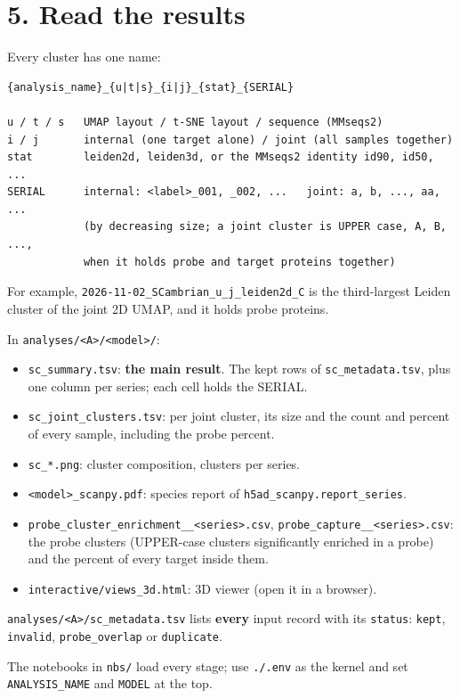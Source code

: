 \documentclass[
  10pt,
]{article}
\providecommand{\tightlist}{%
  \setlength{\itemsep}{0pt}\setlength{\parskip}{0pt}}
\begin{document}
\section{5. Read the results}

Every cluster has one name:

\begin{verbatim}
{analysis_name}_{u|t|s}_{i|j}_{stat}_{SERIAL}

u / t / s   UMAP layout / t-SNE layout / sequence (MMseqs2)
i / j       internal (one target alone) / joint (all samples together)
stat        leiden2d, leiden3d, or the MMseqs2 identity id90, id50, ...
SERIAL      internal: <label>_001, _002, ...   joint: a, b, ..., aa, ...
            (by decreasing size; a joint cluster is UPPER case, A, B, ...,
            when it holds probe and target proteins together)
\end{verbatim}

For example, \texttt{2026-11-02\_SCambrian\_u\_j\_leiden2d\_C} is the third-largest Leiden cluster of the joint 2D UMAP, and it holds probe proteins.

In \texttt{analyses/<A>/<model>/}:

\begin{itemize}
\tightlist
\item \texttt{sc\_summary.tsv}: \textbf{the main result}. The kept rows of \texttt{sc\_metadata.tsv}, plus one column per series; each cell holds the SERIAL.
\item \texttt{sc\_joint\_clusters.tsv}: per joint cluster, its size and the count and percent of every sample, including the probe percent.
\item \texttt{sc\_*.png}: cluster composition, clusters per series.
\item \texttt{<model>\_scanpy.pdf}: species report of \texttt{h5ad\_scanpy.report\_series}.
\item \texttt{probe\_cluster\_enrichment\_\_<series>.csv}, \texttt{probe\_capture\_\_<series>.csv}: the probe clusters (UPPER-case clusters significantly enriched in a probe) and the percent of every target inside them.
\item \texttt{interactive/views\_3d.html}: 3D viewer (open it in a browser).
\end{itemize}

\texttt{analyses/<A>/sc\_metadata.tsv} lists \textbf{every} input record with its \texttt{status}: \texttt{kept}, \texttt{invalid}, \texttt{probe\_overlap} or \texttt{duplicate}.

The notebooks in \texttt{nbs/} load every stage; use \texttt{./.env} as the kernel and set \texttt{ANALYSIS\_NAME} and \texttt{MODEL} at the top.
\end{document}
